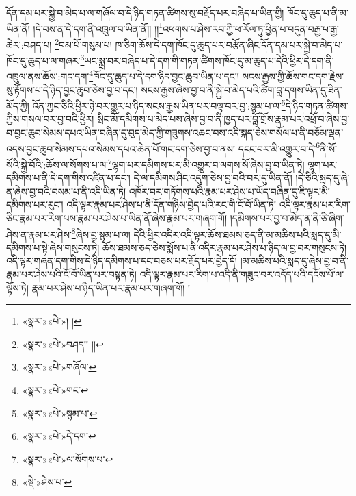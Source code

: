 དོན་དམ་པར་སྐྱེ་བ་མེད་པ་ལ་གཞོལ་བ་དེ་ཉིད་གཏན་ཚིགས་སུ་བརྗོད་པར་བཞེད་པ་ཡིན་གྱི། ཁོང་དུ་ཆུད་པ་ནི་མ་ཡིན་ནོ། །དེ་བས་ན་དེ་དག་ནི་འཁྲུལ་བ་ཡིན་ནོ།། །།\footnote{«སྣར་»«པེ་»། །}འཕགས་པ་ཤེས་རབ་ཀྱི་ཕ་རོལ་ཏུ་ཕྱིན་པ་བདུན་བརྒྱ་པ་རྒྱ་ཆེར་:བཤད་པ། \footnote{«སྣར་»«པེ་»བཤད།། །། }བམ་པོ་གསུམ་པ། ཁ་ཅིག་ཆོས་དེ་དག་ཁོང་དུ་ཆུད་པར་བརྩོན་ཞིང་དོན་དམ་པར་སྐྱེ་བ་མེད་པ་ཁོང་དུ་ཆུད་པ་ལ་གཞར་\footnote{«སྣར་»«པེ་»གཞོལ་}ཡང་སྨྲ་བར་བཞེད་པ་དེ་དག་གི་གཏན་ཚིགས་ཁོང་དུ་མ་ཆུད་པ་དེའི་ཕྱིར་དེ་དག་ནི་འཁྲུལ་ནས་ཆོས་:གང་དག་\footnote{«སྣར་»«པེ་»གང་}ཁོང་དུ་ཆུད་པ་དེ་དག་ཉིད་བྱང་ཆུབ་ཡིན་པ་དང་། སངས་རྒྱས་ཀྱི་ཆོས་གང་དག་རྗེས་སུ་རྟོགས་པ་དེ་ཉིད་བྱང་ཆུབ་ཅེས་བྱ་བ་དང་། སངས་རྒྱས་ཞེས་བྱ་བ་ནི་སྐྱེ་བ་མེད་པའི་ཚིག་བླ་དགས་ཡིན་དུ་ཟིན་མོད་ཀྱི། འོན་ཀྱང་ཅིའི་ཕྱིར་ཉེ་བར་གྱུར་པ་ཉིད་སངས་རྒྱས་ཡིན་པར་བལྟ་བར་བྱ་:སྙམ་པ་ལ་\footnote{«སྣར་»«པེ་»སྙམ་པ་}དེ་ཉིད་གཏན་ཚིགས་ཀྱིས་གསལ་བར་བྱ་བའི་ཕྱིར། སྲིང་མོ་དམིགས་པ་མེད་པས་ཞེས་བྱ་བ་ནི་ཁྱད་པར་བློ་གྲོས་རྣམ་པར་འཕྲོ་བ་ཞེས་བྱ་བ་བྱང་ཆུབ་སེམས་དཔའ་ཡིན་བཞིན་དུ་བུད་མེད་ཀྱི་གཟུགས་འཆང་བས་འདི་སྐད་ཅེས་གསོལ་པ་ནི་བཅོམ་ལྡན་འདས་བྱང་ཆུབ་སེམས་དཔའ་སེམས་དཔའ་ཆེན་པོ་གང་དག་ཅེས་བྱ་བ་ནས། དངང་བར་མི་འགྱུར་བ་དེ་\footnote{«སྣར་»«པེ་»དེ་དག་}ནི་སོ་སོའི་སྐྱེ་བོའི་:ཆོས་ལ་སོགས་པ་ལ་\footnote{«སྣར་»«པེ་»ལ་སོགས་པ་}ལྷག་པར་དམིགས་པར་མི་འགྱུར་བ་ལགས་སོ་ཞེས་བྱ་བ་ཡིན་ཏེ། ལྷག་པར་དམིགས་པ་ནི་དེ་དག་གིས་འཛིན་པ་དང་། དེ་ལ་དམིགས་ཤིང་འདུག་ཅེས་བྱ་བའི་བར་དུ་ཡིན་ནོ། །དེ་ཅིའི་སླད་དུ་ཞེ་ན་ཞེས་བྱ་བའི་བསམ་པ་ནི་འདི་ཡིན་ཏེ། འཁོར་བར་གཏོགས་པའི་རྣམ་པར་ཤེས་པ་ཡོད་བཞིན་དུ་ཇི་ལྟར་མི་དམིགས་པར་རུང་། འདི་ལྟར་རྣམ་པར་ཤེས་པ་ནི་དོན་གཉིས་བྱེད་པའི་རང་གི་ངོ་བོ་ཡིན་ཏེ། འདི་ལྟར་རྣམ་པར་རིག་ཅིང་རྣམ་པར་རིག་པས་རྣམ་པར་ཤེས་པ་ཡིན་ནོ་ཞེས་རྣམ་པར་གཞག་གོ། །དམིགས་པར་བྱ་བ་མེད་ན་ནི་ཅི་ཞིག་ཤེས་ན་རྣམ་པར་ཤེས་\footnote{«སྡེ་»ཤེས་པ་}ཞེས་བྱ་སྙམ་པ་ལ། དེའི་ཕྱིར་འདིར་འདི་ལྟར་ཆོས་ཐམས་ཅད་ནི་མ་མཆིས་པའི་སླད་དུ་མི་དམིགས་པ་སྟེ་ཞེས་གསུངས་ཏེ། ཆོས་ཐམས་ཅད་ཅེས་སྨོས་པ་ནི་འདིར་རྣམ་པར་ཤེས་པ་ཉིད་ལ་བྱ་བར་གསུངས་ཏེ། འདི་ལྟར་གཞན་དག་གིས་དེ་ཉིད་དམིགས་པ་དང་བཅས་པར་རྗོད་པར་བྱེད་དོ། །མ་མཆིས་པའི་སླད་དུ་ཞེས་བྱ་བ་ནི་རྣམ་པར་ཤེས་པའི་ངོ་བོ་ཡིན་པར་བསྟན་ཏེ། འདི་ལྟར་རྣམ་པར་རིག་པ་འདི་ནི་གཟུང་བར་འདོད་པའི་དངོས་པོ་ལ་ལྟོས་ཏེ། རྣམ་པར་ཤེས་པ་ཉིད་ཡིན་པར་རྣམ་པར་གཞག་གོ། །
